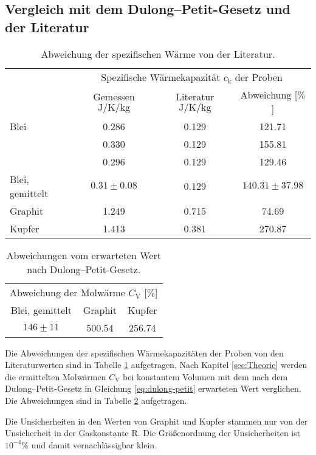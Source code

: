 \subsection{Vergleich mit dem Dulong--Petit-Gesetz und der Literatur}
\begin{table}[htbp]
	\centering
	\begin{tabular}{lccc}
		\toprule
		&\multicolumn{3}{c}{Spezifische Wärmekapazität $c_\text{k}$ der Proben}\\
		&{Gemessen $\si{\joule\per\kelvin\per\kilo\gram}$}  &{Literatur $\si{\joule\per\kelvin\per\kilo\gram}$}& {Abweichung [$\%$]}\\
		\midrule
		{Blei}	&0.286	&0.129	&121.71\\
				&0.330	&0.129	&155.81\\
		 		&0.296	&0.129	&129.46\\
		{Blei, gemittelt}	&$0.31\pm0.08$	&0.129	&$140.31\pm 37.98$\\
		{Graphit}&1.249 &0.715& 74.69\\
		{Kupfer}&1.413	&0.381	& 270.87\\
		\bottomrule
	\end{tabular}
	\caption{Abweichung der spezifischen Wärme von der Literatur. \cite{waermekapazitaetkupfer} \cite{waermekapazitaetblei} }
	\label{tab:compare}
\end{table}
\begin{table}[htbp]
	\centering
	\begin{tabular}{ccc}
		\toprule
		\multicolumn{3}{c}{Abweichung der Molwärme $C_\text{V}$ [$\%$]}\\
		{Blei, gemittelt}	&{Graphit}&{Kupfer}\\
		\midrule
		$146\pm11$	&500.54	&256.74\\
		\bottomrule
	\end{tabular}
	\caption{Abweichungen vom erwarteten Wert nach Dulong--Petit-Gesetz.}
	\label{tab:failz}
\end{table}
Die Abweichungen der spezifischen Wärmekapazitäten der Proben von den Literaturwerten sind in Tabelle \ref{tab:compare} aufgetragen.
Nach Kapitel \ref{sec:Theorie} werden die ermittelten Molwärmen $C_\mathup{V}$ bei konstantem Volumen mit dem nach dem Dulong--Petit-Gesetz in Gleichung \eqref{eq:dulong-petit} erwarteten Wert verglichen.
Die Abweichungen sind in Tabelle \ref{tab:failz} aufgetragen. 

Die Unsicherheiten in den Werten von Graphit und Kupfer stammen nur von der Unsicherheit in der Gaskonstante $\mathup{R}$. 
Die Größenordnung der Unsicherheiten ist $10^{-4}\%$ und damit vernachlässigbar klein.
